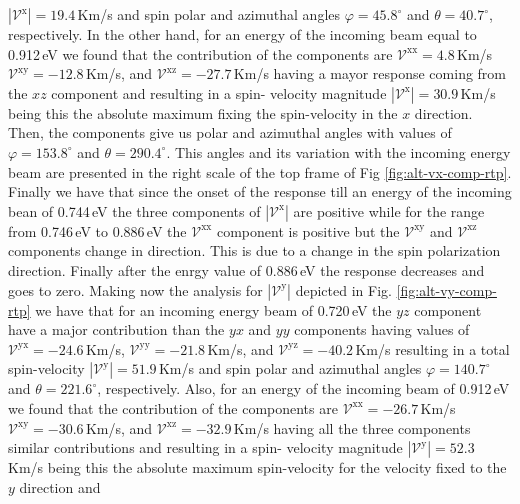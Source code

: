 \documentclass[prb,11pt,tightenlines,twocolumn,aps]{revtex4-1}
\begin{document}
% 
$|\mathcal{V}^{\mathrm{x}}|=19.4$\,Km/s 
% 
and spin polar and azimuthal angles $\varphi = 45.8^{\circ}$ and
$\theta=40.7^{\circ}$, respectively.
%
In the other hand, for an energy of the incoming beam equal to 0.912\,eV
we found that the contribution of the components are 
% 
$\mathcal{V}^{\mathrm{xx}}=   4.8$\,Km/s
$\mathcal{V}^{\mathrm{xy}}= -12.8$\,Km/s, and 
$\mathcal{V}^{\mathrm{xz}}= -27.7$\,Km/s
% 
having a mayor response coming from the $xz$ component and resulting in a spin-
velocity magnitude $|\mathcal{V}^{\mathrm{x}}|=30.9$\,Km/s being this the
absolute maximum fixing the spin-velocity in the $x$ direction. Then, the
components give us polar and azimuthal angles with values of
$\varphi=153.8^{\circ}$ and $\theta=290.4^{\circ}$. This angles and its
variation with the incoming energy beam are presented in the right scale of the
top frame of Fig \ref{fig:alt-vx-comp-rtp}.
% 
Finally we have that since the onset of the response till an energy of the
incoming bean of 0.744\,eV the three components of $|\mathcal{V}^{\mathrm{x}}|$
are positive while for the range from 0.746\,eV to 0.886\,eV the
$\mathcal{V}^{\mathrm{xx}}$ component is positive but the
$\mathcal{V}^{\mathrm{xy}}$ and $\mathcal{V}^{\mathrm{xz}}$ components change in
direction. This is due to a change in the spin polarization direction. Finally after the enrgy value of 0.886\,eV the response decreases and goes to zero. 
Making now the analysis for $|\mathcal{V}^{\mathrm{y}}|$ depicted in Fig.
\ref{fig:alt-vy-comp-rtp} we have that for an incoming energy beam of 0.720\,eV the $yz$ component have a major contribution than the $yx$ and $yy$ components having values of 
% 
$\mathcal{V}^{\mathrm{yx}}= -24.6$\,Km/s, 
$\mathcal{V}^{\mathrm{yy}}= -21.8$\,Km/s, and
$\mathcal{V}^{\mathrm{yz}}= -40.2$\,Km/s
%
resulting in a total spin-velocity
% 
$|\mathcal{V}^{\mathrm{y}}|=51.9$\,Km/s
%
and spin polar and azimuthal angles $\varphi=140.7^{\circ}$ and $\theta=221.6^{\circ}$, respectively.
%
Also, for an energy of the incoming beam of 0.912\,eV we found that the contribution of the components are 
% 
$\mathcal{V}^{\mathrm{xx}}=-26.7$\,Km/s
$\mathcal{V}^{\mathrm{xy}}=-30.6$\,Km/s, and
$\mathcal{V}^{\mathrm{xz}}=-32.9$\,Km/s
% 
having all the three components similar contributions and resulting in a spin-
velocity magnitude $|\mathcal{V}^{\mathrm{y}}|=52.3$\,Km/s being this the
absolute maximum spin-velocity for the velocity fixed to the $y$ direction and
\end{document}
